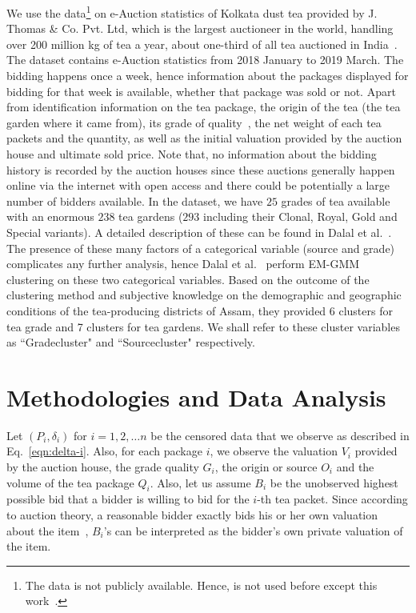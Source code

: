 \documentclass[a4paper,12pt]{article}
\begin{document}
We use the data\footnote{The data is not publicly available. Hence, is not used before except this work~\cite{dalal2020information}.} on e-Auction statistics of Kolkata dust tea provided by J. Thomas \& Co. Pvt. Ltd, which is the largest auctioneer in the world, handling over 200 million kg of tea a year, about one-third of all tea auctioned in India~\cite{dalal2020information}. The dataset contains e-Auction statistics from 2018 January to 2019 March. The bidding happens once a week, hence information about the packages displayed for bidding for that week is available, whether that package was sold or not. Apart from identification information on the tea package, the origin of the tea (the tea garden where it came from), its grade of quality~\cite{tealeafgrades}, the net weight of each tea packets and the quantity, as well as the initial valuation provided by the auction house and ultimate sold price. Note that, no information about the bidding history is recorded by the auction houses since these auctions generally happen online via the internet with open access and there could be potentially a large number of bidders available. In the dataset, we have $25$ grades of tea available with an enormous $238$ tea gardens ($293$ including their Clonal, Royal, Gold and Special variants). A detailed description of these can be found in Dalal et al.~\cite{dalal2020information}. The presence of these many factors of a categorical variable (source and grade) complicates any further analysis, hence Dalal et al.~\cite{dalal2020information} perform EM-GMM clustering on these two categorical variables. Based on the outcome of the clustering method and subjective knowledge on the demographic and geographic conditions of the tea-producing districts of Assam, they provided 6 clusters for tea grade and 7 clusters for tea gardens. We shall refer to these cluster variables as ``Gradecluster" and ``Sourcecluster" respectively.


\section{Methodologies and Data Analysis}
Let $(P_i, \delta_i)$ for $i = 1, 2, \dots n$ be the censored data that we observe as described in Eq.~\eqref{eqn:delta-i}. Also, for each package $i$, we observe the valuation $V_i$ provided by the auction house, the grade quality $G_i$, the origin or source $O_i$ and the volume of the tea package $Q_i$. Also, let us assume $B_i$ be the unobserved highest possible bid that a bidder is willing to bid for the $i$-th tea packet. Since according to auction theory, a reasonable bidder exactly bids his or her own valuation about the item~\cite{levin1996optimal}, $B_i$'s can be interpreted as the bidder's own private valuation of the item.
\end{document}
